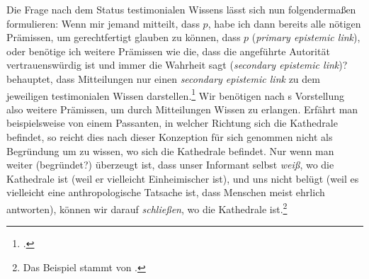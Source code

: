 Die Frage nach dem Status testimonialen Wissens lässt sich nun folgendermaßen
formulieren: Wenn mir jemand mitteilt, dass $p$, habe ich dann bereits alle
nötigen Prämissen, um gerechtfertigt glauben zu können, dass $p$ (\emph{primary
epistemic link}), oder benötige ich weitere Prämissen wie die, dass die
angeführte Autorität vertrauenswürdig ist und immer die Wahrheit sagt (\emph{secondary epistemic
link})?  behauptet, dass Mitteilungen nur einen \emph{secondary
epistemic link} zu dem jeweiligen testimonialen Wissen
darstellen.\footnote{\cite[Vgl.][]{Fricker:TheEpistemologyofTestimony1987}.} Wir
benötigen nach s Vorstellung also weitere Prämissen, um durch
Mitteilungen Wissen zu erlangen.
Erfährt man beispielsweise von einem Passanten, in welcher Richtung sich die
Kathedrale befindet, so reicht dies nach dieser Konzeption für sich genommen
nicht als Begründung um zu wissen, wo sich die Kathedrale befindet. Nur wenn man weiter (begründet?) überzeugt ist, dass
unser Informant selbst \emph{weiß}, wo die Kathedrale ist (weil er vielleicht
Einheimischer ist), und uns nicht belügt (weil es vielleicht eine
anthropologische Tatsache ist, dass Menschen meist ehrlich antworten), können
wir darauf \emph{schließen}, wo die Kathedrale ist.\footnote{Das Beispiel
stammt von \textcite[vgl.][\pno~197\,f.]{McDowell:KnowledgebyHearsay1994}.}



